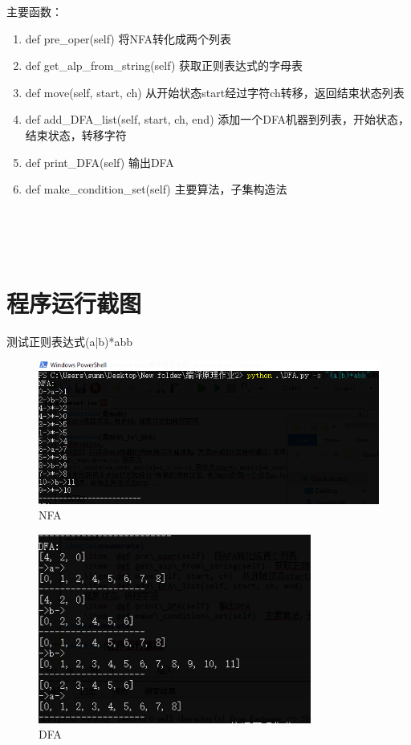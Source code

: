 \documentclass[]{article}
\begin{document}
主要函数：
\begin{enumerate}
	\item  def pre\_oper(self)  将NFA转化成两个列表
	\item  def get\_alp\_from\_string(self)  获取正则表达式的字母表
	\item  def move(self, start, ch)  从开始状态start经过字符ch转移，返回结束状态列表
	\item  def add\_DFA\_list(self, start, ch, end)  添加一个DFA机器到列表，开始状态，结束状态，转移字符
	\item  def print\_DFA(self)  输出DFA
	\item  def make\_condition\_set(self)  主要算法，子集构造法
\end{enumerate}
~\\\
~\\\
\section{程序运行截图}
测试正则表达式(a|b)*abb

\begin{figure}[h]
	\centering
	\includegraphics[width = 1\textwidth]{1.PNG}
	\caption{NFA}
\end{figure}

\begin{figure}[h]
	\centering
	\includegraphics[width = 0.8\textwidth]{2.PNG}
	\caption{DFA}
\end{figure}
\end{document}
